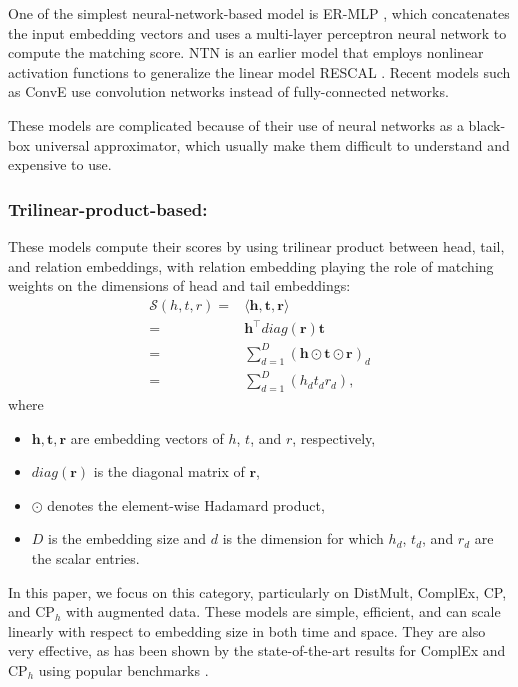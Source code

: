 \documentclass[sigconf,edbt]{acmart-edbt2019}
\def\vh{{\bm{h}}}
\def\vr{{\bm{r}}}
\def\vt{{\bm{t}}}
\def\gS{{\mathcal{S}}}
\begin{document}
One of the simplest neural-network-based model is ER-MLP \cite{dong_knowledgevaultwebscale_2014}, which concatenates the input embedding vectors and uses a multi-layer perceptron neural network to compute the matching score.
NTN \cite{socher_reasoningneuraltensor_2013} is an earlier model that employs nonlinear activation functions to generalize the linear model RESCAL \cite{nickel_threewaymodelcollective_2011}. Recent models such as ConvE \cite{dettmers_convolutional2dknowledge_2018} use convolution networks instead of fully-connected networks.

These models are complicated because of their use of neural networks as a black-box universal approximator, which usually make them difficult to understand and expensive to use.

\subsubsection{Trilinear-product-based:} These models compute their scores by using trilinear product between head, tail, and relation embeddings, with relation embedding playing the role of matching weights on the dimensions of head and tail embeddings:
\begin{equation} \label{eq:trilinear}
\begin{split}
\gS(h,t,r) = &\langle \vh, \vt, \vr \rangle \\
= & \vh^\top diag(\vr) \vt \\
= &\sum_{d=1}^{D} \left(\vh \odot \vt \odot \vr\right)_d \\
= &\sum_{d=1}^{D} \left(h_d t_d r_d\right),
\end{split}
\end{equation}
where 
\begin{itemize}
	\item $ \vh, \vt, \vr $ are embedding vectors of $ h $, $ t $, and $ r $, respectively,
	\item $ diag(\vr) $ is the diagonal matrix of $ \vr $,
	\item $ \odot $ denotes the element-wise Hadamard product,
	\item $ D $ is the embedding size and $ d $ is the dimension for which $ h_d $, $ t_d $, and $ r_d $ are the scalar entries.
\end{itemize}

In this paper, we focus on this category, particularly on DistMult, ComplEx, CP, and CP$ _h $ with augmented data. These models are simple, efficient, and can scale linearly with respect to embedding size in both time and space. They are also very effective, as has been shown by the state-of-the-art results for ComplEx and CP$ _h $ using popular benchmarks \cite{trouillon_complexembeddingssimple_2016} \cite{lacroix_canonicaltensordecomposition_2018}.
\end{document}
